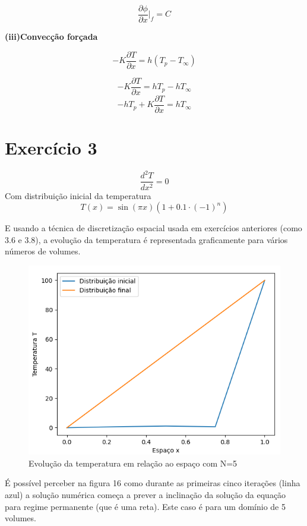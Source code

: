 \documentclass[]{article}
\begin{document}
\begin{equation}
	\frac{\partial \phi}{\partial x} \bigg|_f = C
\end{equation}


\textbf{(iii)Convecção forçada}

\begin{equation}
	-K\frac{\partial T}{\partial x} = h(T_p - T_{\infty})
\end{equation}

\begin{equation}
	-K\frac{\partial T}{\partial x} = hT_p - hT_{\infty}
\end{equation}
\begin{equation}
	-hT_p + K\frac{\partial T}{\partial x} = hT_{\infty}
\end{equation}


\section*{Exercício 3}

\begin{equation}
	\frac{d^2 T}{dx^2} = 0
\end{equation}
Com distribuição inicial da temperatura
\begin{equation}
	T(x) = \sin(\pi x) \left( 1 + 0.1 \cdot (-1)^n \right)
\end{equation}

E usando a técnica de discretização espacial usada em exercícios anteriores (como 3.6 e 3.8), a evolução da temperatura é representada graficamente para vários números de volumes.
\begin{figure}[H]
	\centering
	\includegraphics[width=.65\textwidth]{figures/3-2}
	\caption{Evolução da temperatura em relação ao espaço com N=5}
\end{figure}
É possível perceber na figura 16 como durante as primeiras cinco iterações (linha azul) a solução numérica começa a prever a inclinação da solução da equação para regime permanente (que é uma reta). Este caso é para um domínio de 5 volumes.
\end{document}
